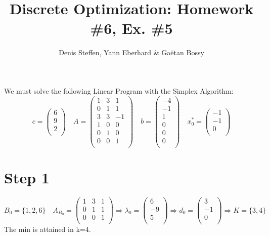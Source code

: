 \documentclass[a4paper,11pt,french]{article}
\title{Discrete Optimization: Homework \#6, Ex. \#5}
\author{Denis Steffen, Yann Eberhard \& Gaëtan Bossy}
\begin{document}
    
    \maketitle
    We must solve the following Linear Program with the Simplex Algorithm:
    \begin{displaymath}
    c=\left(\begin{array}{c} 6\\ 9\\ 2\\ \end{array}\right)\quad A=\left(
\begin{array}{ccc}
1 & 3 & 1\\
0 & 1 & 1 \\
3 & 3 & -1\\
1 & 0 & 0\\
0 & 1 & 0\\
0 & 0 & 1\\
\end{array}
\right) \quad b=\left(\begin{array}{c}-4\\-1\\1\\0\\0\\0\\ \end{array}\right)\quad x_{0}^*=\left(\begin{array}{c}-1\\-1\\0\\\end{array}\right)
  \end{displaymath}
  \section{Step 1}
  \begin{displaymath}
  B_0=\{1,2,6\}\quad A_{B_0}=\left(
\begin{array}{ccc}
1 & 3 & 1\\
0 & 1 & 1 \\
0 & 0 & 1\\
\end{array}
\right) \Rightarrow \lambda_0=\left(\begin{array}{c} 6\\ -9\\ 5\\ \end{array}\right)\Rightarrow d_0=\left(\begin{array}{c} 3\\ -1\\ 0\\ \end{array}\right)\Rightarrow K=\{3,4\}
   \end{displaymath}
   The min is attained in k=4.
\end{document}
